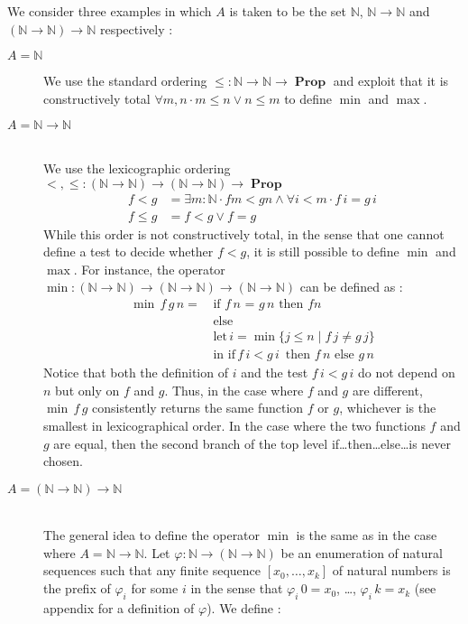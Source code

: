 \documentclass[envcountsame]{llncs}
\newcommand{\N}{\mathbb{N}}
\DeclareMathOperator{\Prop}{\mathbf{Prop}}
\begin{document}
We consider three examples in which  $A$ is taken to be the set $\N$, $\N\to\N$ and $(\N\to\N)\to\N$ respectively :
\begin{description}
\item[$A = \N$] \hfill

We use the standard ordering $\leq : \N \to \N \to \Prop$ and exploit
that it is constructively total $\forall m ,n\cdot m \leq n \lor n \leq m$ to define $\min$ and
$\max$.

\bigskip
\item[$A=\N\to\N$] \hfill\\
We use the lexicographic ordering ${<},{\leq}:(\N \to \N) \to (\N\to\N)\to\Prop$
\begin{align*}
f < g & = \exists m:\N \cdot f m < g n \wedge \forall i<m\cdot f\,i = g \,i\\
f \leq g &= f < g \vee f=g
\end{align*}
While this order is not constructively total, in the sense that one cannot define a test to decide whether $f<g$, it is still possible to define $\min$ and $\max$.
For instance, the operator $\min : (\N \to \N) \to (\N\to\N) \to (\N \to \N)$ can be defined as :
\begin{align*}
 \min\,f\,g\,n =\,&\text{if $f \,n$ = $g\,n$ then $f n$}\\
                 &\text{else }\\
                 &\text{let}\,i = \min \{ j \leq n \mid f\,j \not= g\,j \}\\
                 &\text{in }\text{if}\, f\,i< g\,i\,\text{ then } f\,n \text{ else } g\,n
\end{align*}
Notice that both the definition of $i$ and the test $f\,i< g\,i$ do not depend on $n$ but only on $f$ and $g$.  Thus, in the case where $f$ and $g$ are different, $\min\,f\,g$ consistently returns the same function $f$ or $g$, whichever is the smallest in lexicographical order. In the case where the two functions $f$ and $g$ are equal, then the second branch of the top level if\dots then\dots else\dots is never chosen.

\bigskip
\item[$A=(\N\to\N)\to\N$] \hfill\\
The general idea to define the operator $\min$ is the same as in the case where $A=\N\to\N$. Let $\varphi : \N \to (\N\to\N)$ be an enumeration of natural sequences such that any finite sequence $[x_0,\dots,x_k]$ of
natural numbers is the prefix of $\varphi_i$ for some $i$  in the sense that $\varphi_i \,0 = x_0$, \dots, $\varphi_i\,k = x_k$ (see appendix for a definition of $\varphi$).
 We define : 






\end{description}
\end{document}
